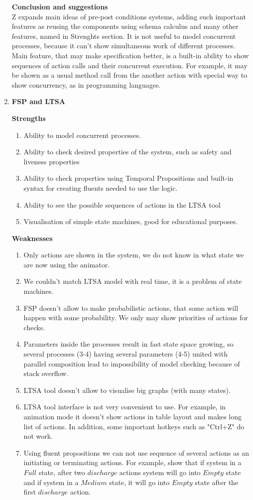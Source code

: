 \documentclass{article}
\begin{document}
\begin{enumerate}
\textbf{Conclusion and suggestions}\\
Z expands main ideas of pre-post conditions systems, adding such important features as reusing the components using schema calculus and many other features, named in Strenghts section.  It is not useful to model concurrent processes, because it can't show simultaneous work of different processes.
\\ Main feature, that may make specification better, is a built-in ability to show sequences of action calls and their concurrent execution. For example, it may be shown as a usual method call from the another action with special way to show concurrency, as in programming languages.\\

\item \textbf{FSP and LTSA}

\textbf{Strengths}
\begin{enumerate}
\item Ability to model concurrent processes.
\item Ability to check desired properties of the system, such as safety and liveness properties
\item Ability to check properties using Temporal Propositions and built-in syntax for creating fluents needed to use the logic.
\item Ability to see the possible sequences of actions in the LTSA tool
\item Visualisation of simple state machines, good for educational purposes.

\end{enumerate}
\textbf{Weaknesses}
\begin{enumerate}
\item Only actions are shown in the system, we do not know in what state we are now using the animator.
\item We couldn't match LTSA model with real time, it is a problem of state machines. 
\item 	FSP doesn't allow to make probabilistic actions, that some action will happen with some probability. We only may show priorities of actions for checks.
\item 	Parameters inside the processes result in fast state space growing, so several processes (3-4) having several parameters (4-5) united with parallel composition lead to impossibility of model checking because of stack overflow.
\item 	LTSA tool doesn't allow to visualise big graphs (with many states).
\item 	LTSA tool interface is not very convenient to use. For example, in animation mode it doesn't show actions in table layout and makes long list of actions. In addition, some important hotkeys such as "Ctrl+Z" do not work.
\item 	Using fluent propositions we can not use sequence of several actions as an initiating or terminating actions. For example, show that if system in a $Full$ state, after two $discharge$ actions system will go into $Empty$ state and if system in a $Medium$ state, it will go into $Empty$ state after the first $discharge$ action.
	

\end{enumerate}
\end{enumerate}
\end{document}
